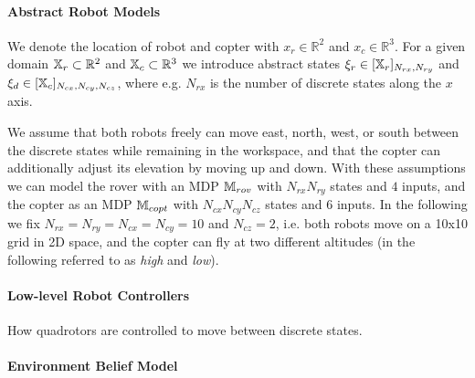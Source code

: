 \documentclass[conference]{IEEEtran}
\begin{document}
\paragraph{Abstract Robot Models}

We denote the location of robot and copter with $x_r \in \mathbb{R}^2$ and $x_c \in \mathbb{R}^3$. For a given domain $\mathbb{X}_r \subset \mathbb{R}^2$ and $\mathbb{X}_c \subset \mathbb{R}^3$ we introduce abstract states $\xi_r \in [\mathbb{X}_r]_{N_{rx}, N_{ry}}$ and $\xi_d \in [\mathbb{X}_c]_{N_{cx}, N_{cy}, N_{cz}}$, where e.g. $N_{rx}$ is the number of discrete states along the $x$ axis. 

We assume that both robots freely can move east, north, west, or south between the discrete states while remaining in the workspace, and that the copter can additionally adjust its elevation by moving up and down. With these assumptions we can model the rover with an MDP $\mathbb{M}_{rov}$ with $N_{rx} N_{ry}$ states and $4$ inputs, and the copter as an MDP $\mathbb{M}_{copt}$ with $N_{cx} N_{cy} N_{cz}$ states and $6$ inputs. In the following we fix $N_{rx} = N_{ry} = N_{cx} = N_{cy} = 10$ and $N_{cz} = 2$, i.e. both robots move on a 10x10 grid in 2D space, and the copter can fly at two different altitudes (in the following referred to as \emph{high} and \emph{low}).

\paragraph{Low-level Robot Controllers}

How quadrotors are controlled to move between discrete states.


\paragraph{Environment Belief Model}
\end{document}

